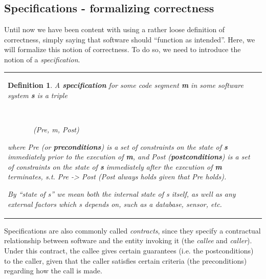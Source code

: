 \documentclass{article}
\newcommand{\tmem}[1]{{\em #1\/}}
\newcommand{\tmtextbf}[1]{{\bfseries{#1}}}
\newenvironment{tmparmod}[3]{\begin{list}{}{\setlength{\topsep}{0pt}\setlength{\leftmargin}{#1}\setlength{\rightmargin}{#2}\setlength{\parindent}{#3}\setlength{\listparindent}{\parindent}\setlength{\itemindent}{\parindent}\setlength{\parsep}{\parskip}} \item[]}{\end{list}}
\newtheorem{definition}{Definition}
{\theorembodyfont{\rmfamily}\newtheorem{example}{Example}}
\begin{document}
\subsection{Specifications - formalizing correctness}

Until now we have been content with using a rather loose definition of
correctness, simply saying that software should ``function as intended''.
Here, we will formalize this notion of correctness. To do so, we need to
introduce the notion of a {\tmem{specification}}.



\begin{tmparmod}{1cm}{0pt}{0pt}
  \begin{tmparmod}{0pt}{1cm}{0pt}
    {\noindent}{\noindent}\begin{tabular}{l}
      \begin{definition}
        
        
        
        
        A \tmtextbf{specification} for some code segment \tmtextbf{m} in some
        software system \tmtextbf{s} is a triple
        
        \ \
        
        \ \ \ \ \ \ \ (Pre, m, Post)
        
        
        
        where Pre (or \tmtextbf{preconditions}) is a set of constraints on the
        state of \tmtextbf{s} immediately prior to the execution of
        \tmtextbf{m}, and Post (\tmtextbf{postconditions}) is a set of
        constraints on the state of \tmtextbf{s} immediately after the
        execution of \tmtextbf{m} terminates, s.t. Pre -> Post (Post always
        holds given that Pre holds).
        
        
        
        By ``state of s'' we mean both the internal state of s itself, as well
        as any external factors which s depends on, such as a database,
        sensor, etc. {\tmem{}} 
      \end{definition}
    \end{tabular}{\hspace*{\fill}}{\smallskip}
  \end{tmparmod}
\end{tmparmod}





Specifications are also commonly called {\tmem{contracts}}, since they specify
a contractual relationship between software and the entity invoking it (the
{\tmem{callee}} and {\tmem{caller}}). Under this contract, the callee gives
certain guarantees (i.e. the postconditions) to the caller, given that the
caller satisfies certain criteria (the preconditions) regarding how the call
is made. \
\end{document}
